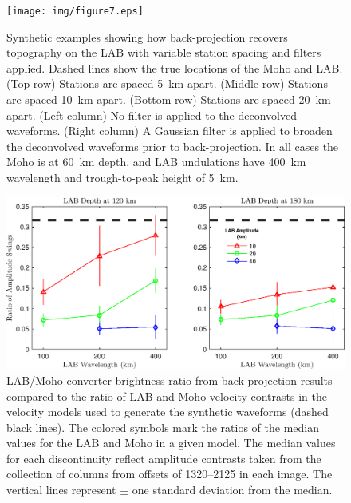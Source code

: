 \documentclass[referee]{gji}
\begin{document}
\begin{figure}
\centering
\texttt{[image: img/figure7.eps]}
\caption{Synthetic examples showing how back-projection recovers topography on the LAB with variable station spacing and filters applied.
Dashed lines show the true locations of the Moho and LAB.
(Top row) Stations are spaced 5~km apart.
(Middle row) Stations are spaced 10~km apart.
(Bottom row) Stations are spaced 20~km apart.
(Left column) No filter is applied to the deconvolved waveforms.
(Right column) A Gaussian filter is applied to broaden the deconvolved waveforms prior to back-projection.
In all cases the Moho is at 60~km depth, and LAB undulations have 400~km wavelength and trough-to-peak height of 5~km.}
\label{fig:StationSpacing}
\end{figure}

\begin{figure}
\centering
\includegraphics[scale=0.75]{img/FigureRecovery.eps}
\caption{LAB/Moho converter brightness ratio from back-projection results compared to the ratio of LAB and Moho velocity contrasts in the velocity models used to generate the synthetic waveforms (dashed black lines).  The colored symbols mark the ratios of the median values for the LAB and Moho in a given model. The median values for each discontinuity reflect amplitude contrasts taken from the collection of columns from offsets of 1320--2125 in each image.  The vertical lines represent $\pm$ one standard deviation from the median.}
\label{fig:FigureRecovery}
\end{figure}


\label{lastpage}
\end{document}
